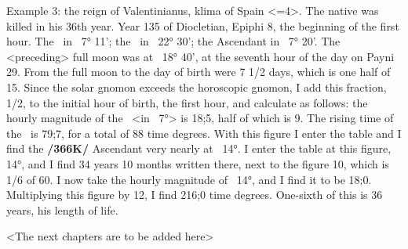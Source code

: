 Example 3: the reign of Valentinianus, klima of Spain <=4>. The native was killed in his 36th year. Year 135 of Diocletian, Epiphi 8, the beginning of the first hour. The \Sun\, in \Cancer\, 7° 11'; the \Moon\, in \Aries\, 22° 30'; the Ascendant in \Cancer\, 7° 20'. The <preceding> full moon was at \Gemini\, 18° 40', at the seventh hour of the day on Payni 29. From the full moon to the day of birth were 7 1/2 days, which is one half of 15. Since the solar gnomon exceeds the horoscopic gnomon, I add this fraction, 1/2, to the initial hour of birth, the first hour, and calculate as follows: the hourly magnitude of the \Sun\, <in \Cancer\, 7°> is 18;5, half of which is 9. The rising time of the \Sun\, is 79;7, for a total of 88 time degrees. With this figure I enter the table and I find the \textbf{/366K/} Ascendant very nearly at \Cancer\, 14°. I enter the table at this figure, 14°, and I find 34 years 10 months written there, next to the figure 10, which is 1/6 of 60. I now take the hourly magnitude of \Cancer\, 14°, and I find it to be 18;0. Multiplying this figure by 12, I find 216;0 time degrees. One-sixth of this is 36 years, his length of life.

\partialsecbr

<The next chapters are to be added here>

\newpage